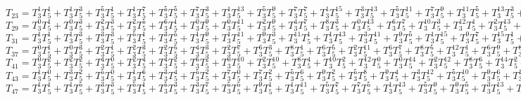 $T_{23} = T_3^{1}T_5^{1} + T_3^{1}T_5^{3} + T_3^{5}T_5^{1} + T_3^{1}T_5^{7} + T_3^{5}T_5^{5} + T_3^{7}T_5^{3} + T_3^{1}T_5^{13} + T_3^{5}T_5^{9} + T_3^{7}T_5^{7} + T_3^{1}T_5^{15} + T_3^{3}T_5^{13} + T_3^{5}T_5^{11} + T_3^{7}T_5^{9} + T_3^{11}T_5^{5} + T_3^{13}T_5^{3} + T_3^{15}T_5^{1} + T_3^{17}T_5^{1} + \dots $\\
$T_{29} = T_3^{0}T_5^{1} + T_3^{0}T_5^{3} + T_3^{2}T_5^{3} + T_3^{2}T_5^{5} + T_3^{6}T_5^{1} + T_3^{0}T_5^{9} + T_3^{0}T_5^{11} + T_3^{2}T_5^{9} + T_3^{4}T_5^{7} + T_3^{8}T_5^{3} + T_3^{0}T_5^{13} + T_3^{6}T_5^{7} + T_3^{10}T_5^{3} + T_3^{12}T_5^{1} + T_3^{2}T_5^{13} + T_3^{8}T_5^{7} + T_3^{4}T_5^{13} + T_3^{6}T_5^{11} + T_3^{12}T_5^{5} + T_3^{14}T_5^{3} + T_3^{16}T_5^{1} + \dots $\\
$T_{31} = T_3^{1}T_5^{1} + T_3^{1}T_5^{3} + T_3^{3}T_5^{3} + T_3^{5}T_5^{1} + T_3^{3}T_5^{5} + T_3^{1}T_5^{9} + T_3^{1}T_5^{11} + T_3^{9}T_5^{3} + T_3^{11}T_5^{1} + T_3^{1}T_5^{13} + T_3^{3}T_5^{11} + T_3^{9}T_5^{5} + T_3^{1}T_5^{15} + T_3^{9}T_5^{7} + T_3^{15}T_5^{1} + T_3^{13}T_5^{5} + T_3^{15}T_5^{3} + \dots $\\
$T_{37} = T_3^{0}T_5^{1} + T_3^{0}T_5^{3} + T_3^{2}T_5^{1} + T_3^{2}T_5^{3} + T_3^{2}T_5^{5} + T_3^{4}T_5^{3} + T_3^{2}T_5^{7} + T_3^{6}T_5^{3} + T_3^{8}T_5^{1} + T_3^{6}T_5^{5} + T_3^{2}T_5^{11} + T_3^{6}T_5^{7} + T_3^{8}T_5^{5} + T_3^{12}T_5^{1} + T_3^{6}T_5^{9} + T_3^{8}T_5^{7} 
+ T_3^{2}T_5^{15} + T_3^{4}T_5^{13} + T_3^{12}T_5^{5} + \dots $\\
$T_{41} = T_3^{0}T_5^{2} + T_3^{2}T_5^{2} + T_3^{4}T_5^{0} + T_3^{2}T_5^{4} + T_3^{4}T_5^{2} + T_3^{6}T_5^{2} + T_3^{0}T_5^{10} + T_3^{2}T_5^{10} + T_3^{8}T_5^{4} + T_3^{10}T_5^{2} + T_3^{12}T_5^{0} + T_3^{0}T_5^{14} + T_3^{2}T_5^{12} + T_3^{8}T_5^{6} + T_3^{14}T_5^{2} + T_3^{4}T_5^{14} + T_3^{8}T_5^{10} + T_3^{10}T_5^{8} + T_3^{16}T_5^{2} + \dots $\\
$T_{43} = T_3^{1}T_5^{0} + T_3^{3}T_5^{2} + T_3^{5}T_5^{0} + T_3^{1}T_5^{6} + T_3^{3}T_5^{4} + T_3^{5}T_5^{2} + T_3^{7}T_5^{0} + T_3^{7}T_5^{2} + T_3^{5}T_5^{6} + T_3^{9}T_5^{2} + T_3^{5}T_5^{8} + T_3^{9}T_5^{4} + T_3^{3}T_5^{12} + T_3^{5}T_5^{10} + T_3^{9}T_5^{6} + T_3^{11}T_5^{4} + T_3^{3}T_5^{14} + T_3^{5}T_5^{12} + T_3^{9}T_5^{8} + T_3^{11}T_5^{6} + T_3^{13}T_5^{4} + \dots $\\
$T_{47} = T_3^{1}T_5^{1} + T_3^{1}T_5^{5} + T_3^{3}T_5^{3} + T_3^{5}T_5^{1} + T_3^{5}T_5^{3} + T_3^{3}T_5^{7} + T_3^{5}T_5^{5} + T_3^{9}T_5^{1} + T_3^{1}T_5^{11} + T_3^{5}T_5^{7} + T_3^{7}T_5^{5} + T_3^{1}T_5^{13} + T_3^{5}T_5^{9} + T_3^{9}T_5^{5} + T_3^{3}T_5^{13} + T_3^{9}T_5^{7} + T_3^{11}T_5^{5} + T_3^{13}T_5^{3} + T_3^{15}T_5^{1} + T_3^{3}T_5^{15} + T_3^{7}T_5^{11} + T_3^{9}T_5^{9} + T_3^{15}T_5^{3} + \dots $\\    

